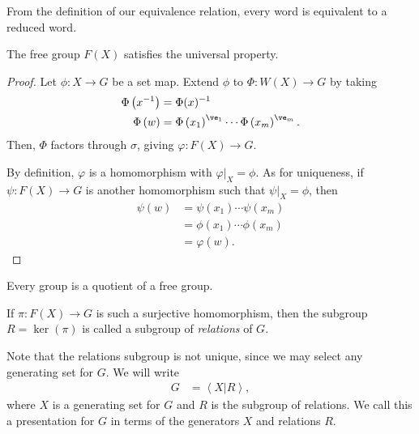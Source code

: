 \documentclass[10pt]{mypackage}
\begin{document}
From the definition of our equivalence relation, every word is equivalent to a reduced word.
\begin{proposition}
  The free group $F(X)$ satisfies the universal property.
\end{proposition}
\begin{proof}
  Let $\phi\colon X\rightarrow G$ be a set map. Extend $\phi$ to $\Phi\colon W(X)\rightarrow G$ by taking
  \begin{align*}
    \Phi\left(x^{-1}\right) &= \Phi(x)^{-1}\\
    \Phi\left( w \right) &= \Phi\left( x_1 \right)^{\ve_1}\cdots \Phi\left( x_m \right)^{\ve_m}.
  \end{align*}
  Then, $\Phi$ factors through $\sigma$, giving $\varphi\colon F(X)\rightarrow G$.%

  By definition, $\varphi$ is a homomorphism with $\varphi|_{X} = \phi$. As for uniqueness, if $\psi\colon F(X)\rightarrow G$ is another homomorphism such that $\psi|_{X} = \phi$, then
  \begin{align*}
    \psi(w) &= \psi\left( x_1 \right)\cdots \psi\left( x_m \right)\\
            &= \phi\left( x_1 \right)\cdots \phi\left( x_m \right)\\
            &= \varphi(w).
  \end{align*}
\end{proof}
\begin{corollary}
  Every group is a quotient of a free group.
\end{corollary}
\begin{definition}
  If $\pi\colon F(X)\rightarrow G$ is such a surjective homomorphism, then the subgroup $R = \ker\left( \pi \right)$ is called a subgroup of \textit{relations} of $G$.
\end{definition}
Note that the relations subgroup is not unique, since we may select any generating set for $G$. We will write
\begin{align*}
  G &= \left\langle X|R \right\rangle,
\end{align*}
where $X$ is a generating set for $G$ and $R$ is the subgroup of relations. We call this a presentation for $G$ in terms of the generators $X$ and relations $R$.
\end{document}
